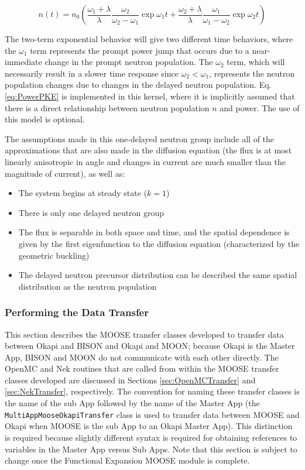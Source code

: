\documentclass[10pt]{article}
\newcommand{\beq}{\begin{equation}}
\newcommand{\eeq}{\end{equation}}
\numberwithin{equation}{section} %
\begin{document}
\beq
\label{eq:PowerPKE}
n(t)=n_0\left(\frac{\omega_1+\lambda}{\lambda}\frac{\omega_2}{\omega_2-\omega_1}\exp{\omega_1 t} + \frac{\omega_2+\lambda}{\lambda}\frac{\omega_1}{\omega_1-\omega_2}\exp{\omega_2 t}\right)
\eeq

The two-term exponential behavior will give two different time behaviors, where the \(\omega_1\) term represents the prompt power jump that occurs due to a near-immediate change in the prompt neutron population. The \(\omega_2\) term, which will necessarily result in a slower time response since \(\omega_2<\omega_1\), represents the neutron population changes due to changes in the delayed neutron population. Eq. \eqref{eq:PowerPKE} is implemented in this kernel, where it is implicitly assumed that there is a direct relationship between neutron population \(n\) and power. The use of this model is optional.

The assumptions made in this one-delayed neutron group include all of the approximations that are also made in the diffusion equation (the flux is at most linearly anisotropic in angle and changes in current are much smaller than the magnitude of current), as well as:

\begin{itemize}
\item The system begins at steady state (\(k=1\))
\item There is only one delayed neutron group
\item The flux is separable in both space and time, and the spatial dependence is given by the first eigenfunction to the diffusion equation (characterized by the geometric buckling)
\item The delayed neutron precursor distribution can be described the same spatial distribution as the neutron population
\end{itemize}

\subsubsection{Performing the Data Transfer}
This section describes the MOOSE transfer classes developed to transfer data between Okapi and BISON and Okapi and MOON; because Okapi is the Master App, BISON and MOON do not communicate with each other directly. The OpenMC and Nek routines that are called from within the MOOSE transfer classes developed are discussed in Sections \ref{sec:OpenMCTransfer} and \ref{sec:NekTransfer}, respectively. The convention for naming these transfer classes is the name of the sub App followed by the name of the Master App (the {\tt MultiAppMooseOkapiTransfer} class is used to transfer data between MOOSE and Okapi when MOOSE is the sub App to an Okapi Master App). This distinction is required because slightly different syntax is required for obtaining references to variables in the Master App versus Sub Apps. Note that this section is subject to change once the Functional Expansion MOOSE module is complete.
\end{document}
